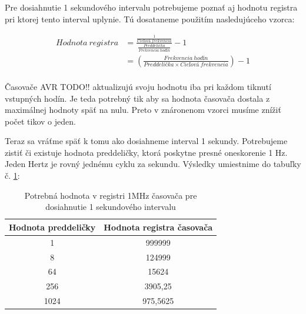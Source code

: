 Pre dosiahnutie 1 sekundového intervalu potrebujeme poznať aj hodnotu registra
pri ktorej tento interval uplynie. Tú dosataneme použitím nasledujúceho vzorca:

\begin{equation}
    \begin{aligned}
        Hodnota\:registra & = \frac{ \frac{1}{Cieľová\:frekvencia}} { \frac{Preddelička}{Frekvencia\:hodín}} - 1 \\
                          & = (\frac{Frekvencia\:hodín}{Preddelička \times Cieľová\:frekvencia}) - 1             \\
    \end{aligned}
\end{equation}

Časovače AVR TODO!! aktualizujú svoju hodnotu iba pri každom tiknutí vstupných hodín. Je teda potrebný tik aby sa hodnota časovača dostala z maximálnej hodnoty späť na nulu. Preto v znáronenom vzorci
musíme znížiť počet tikov o jeden. \par

Teraz sa vráťme späť k tomu ako dosiahneme interval 1 sekundy. Potrebujeme zistiť či existuje hodnota preddeličky, ktorá poskytne presné oneskorenie 1 Hz. Jeden Hertz je rovný jednému cyklu za sekundu.
Výsledky umiestnime do tabuľky č. \ref{table:timerPrescalerValues}:

\begin{table}[!htbp]
    \begin{center}
        \begin{tabular}{|c|c|}
            \hline
            Hodnota preddeličky & Hodnota registra časovača \\
            \hline
            1                   & 999999                    \\
            8                   & 124999                    \\
            64                  & 15624                     \\
            256                 & 3905,25                   \\
            1024                & 975,5625                  \\
            \hline
        \end{tabular}
        \caption{Potrebná hodnota v registri 1MHz časovača pre dosiahnutie 1 sekundového intervalu}
        \label{table:timerPrescalerValues}
    \end{center}
\end{table}


